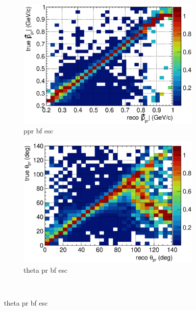      \begin{figure}
        \centering
        \begin{subfigure}[b]{\dbfigwid\textwidth}
             \centering
             \includegraphics[width=\textwidth]{figures/sel/p_pr_colnor_resmat_al13.eps}
             \caption{ppr bf esc}
             \label{subfig:esc-ppr-bfesc}
        \end{subfigure}
        \begin{subfigure}[b]{\dbfigwid\textwidth}
             \centering
             \includegraphics[width=\textwidth]{figures/sel/theta_pr_colnor_resmat_al13.eps}
             \caption{theta pr bf esc}
             \label{subfig:esc-tpr-bfesc}
        \end{subfigure}
        \\

\end{figure}
